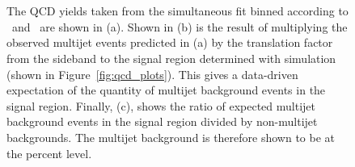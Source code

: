 \begin{figure}[!h]
  \centering
   ~
   \\
   \\
  \caption{
    The QCD yields taken from the simultaneous fit binned according to \njet~and \scalht~are shown in (a).
    Shown in (b) is the result of multiplying the observed multijet events predicted
    in (a) by the translation factor from the sideband to the signal
    region determined with simulation (shown in
    Figure~\ref{fig:qcd_plots}). This gives a data-driven expectation of
    the quantity of multijet background events in the signal region. 
    Finally, (c), shows the ratio of expected
    multijet background events in the signal region divided by
    non-multijet backgrounds. The multijet background is therefore
    shown to be at the percent level.}
  \label{fig:qcd_plots2}
\end{figure}

